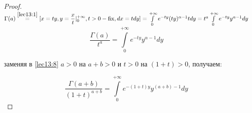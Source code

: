 \documentclass[../../main.tex]{subfiles}
\begin{document}
\begin{proof}
	$\Gamma(a) \stk{lec13:1}= [x=ty, y = \dfrac{x}{t}|^{+\infty}_0, t > 0 - \fix, 
	dx = 
	t dy] = 
	\int\limits_0^{+\infty}e^{-ty}(ty)^{\alpha-1}tdy = t^a 
	\int\limits_0^{+\infty}e^{-ty}y^{\alpha-1}dy$
	\begin{equation}
		\label{lec13:9}
		\dfrac{\Gamma(a)}{t^a}=\int\limits_0^{+\infty}e^{-ty}y^{\alpha-1}dy
	\end{equation}
	
	заменяя в \eqref{lec13:8} $a > 0$ на $a+b > 0$ и $t > 0$ на $(1+t) > 0$, 
	получаем:
	
	\begin{equation}
	\label{lec13:10}
	\dfrac{\Gamma(a+b)}{(1+t)^{a+b}} = \int\limits_0^{+\infty} e^{-(1+t)y} 
	y^{(a+b) - 
	1} dy
	\end{equation}
\end{proof}
\end{document}
